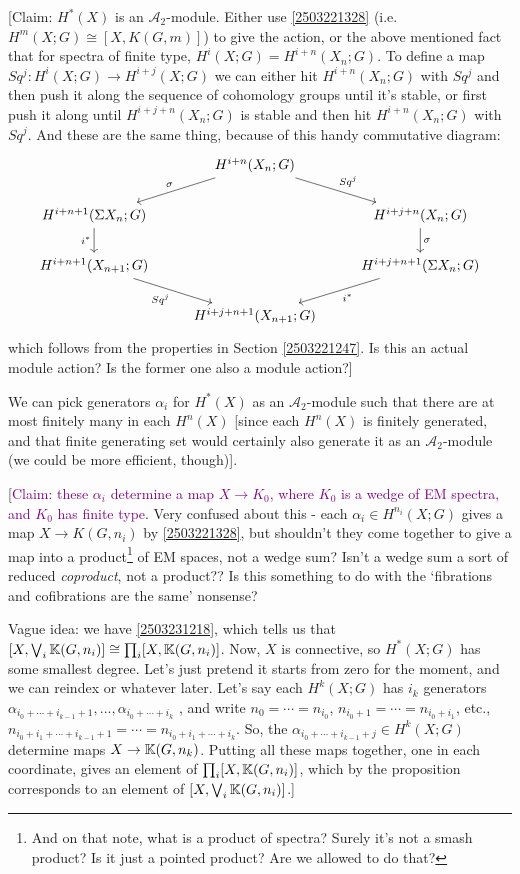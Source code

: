 \documentclass{MetricNotes2023}
\def\bb{\ensuremath\mathbb}
\def\A{\ensuremath{\mathscr{A}_2}}
\def\textcolour{\textcolor}
\begin{document}
[Claim: \(H^*(X)\) is an \(\mathscr{A}_2\)-module. Either use \ref{2503221328} (i.e. \(H^m(X;G)\cong[X,K(G,m)]\)) to give the action, or the above mentioned fact that for spectra of finite type, \(H^i(X; G)=H^{i+n}(X_n;G)\). To define a map \(Sq^j : H^{i}(X;G)\to H^{i+j}(X;G)\) we can either hit \(H^{i+n}(X_n;G)\) with \(Sq^j\) and then push it along the sequence of cohomology groups until it's stable, or first push it along until \(H^{i+j+n}(X_n;G)\) is stable and then hit \(H^{i+n}(X_n;G)\) with \(Sq^j\). And these are the same thing, because of this handy commutative diagram:
\[\begin{tikzcd} 
 & H^{i+n}(X_n;G)  \arrow[dl, "\sigma"'] \arrow[dr, "Sq^j"] & \\ 
 H^{i+n+1}(\Sigma X_n;G) \arrow[d, "i^*"'] & & H^{i+j+n}(X_n;G) \arrow[d, "\sigma"] \\ 
 H^{i+n+1}(X_{n+1};G) \arrow[dr, "Sq^j"'] & & H^{i+j+n+1}(\Sigma X_n;G) \arrow[dl, "i^*"] \\ 
 & H^{i+j+n+1}(X_{n+1};G) &  
\end{tikzcd}\] 
which follows from the properties in Section  \ref{2503221247}. Is this an actual module action? Is the former one also a module action?]

We can pick generators \(\alpha_i\) for \(H^*(X)\) as an \(\mathscr{A}_2\)-module such that there are at most finitely many in each \(H^n(X)\) [since each \(H^n(X)\) is finitely generated, and that finite generating set would certainly also generate it as an \(\A\)-module (we could be more efficient, though)].

[\textcolour{purple}{Claim: these \(\alpha_i\) determine a map \(X \to K_0\), where \(K_0\) is a wedge of EM spectra, and \(K_0\) has finite type}. Very confused about this - each \(\alpha_i\in H^{n_i}(X;G)\) gives a map \(X \to K(G,n_i)\) by \ref{2503221328}, but shouldn't they  come together to give a map into a product\footnote{And on that note, what is a product of spectra? Surely it's not a smash product? Is it just a pointed product? Are we allowed to do that?} of EM spaces, not a wedge sum? Isn't a wedge sum a sort of reduced \textit{coproduct}, not a product?? Is this something to do with the `fibrations and cofibrations are the same' nonsense?

Vague idea: we have \ref{2503231218}, which tells us that \([X, \bigvee_i \bb{K}(G,n_i)]\cong \prod_i[X, \bb{K}(G,n_i)]\). Now, \(X\) is connective, so \(H^*(X;G)\) has some smallest degree. Let's just pretend it starts from zero for the moment, and we can reindex or whatever later. Let's say each \(H^k(X;G)\) has \(i_k\) generators \(\alpha_{i_0+\cdots+i_{k-1}+1}, ...,\alpha_{i_0+\cdots+i_k}\)  , and write \(n_0=\cdots=n_{i_0}\), \(n_{i_0+1}=\cdots= n_{i_0+i_1}\), etc., \(n_{i_0+i_1+\cdots+i_{k-1}+1}=\cdots = n_{i_0+i_1+\cdots+i_k}\). So, the \(\alpha_{i_0+\cdots+i_{k-1}+j}\in H^k(X;G)\) determine maps \(X\to \bb{K}(G,n_k)\). Putting all these maps together, one in each coordinate, gives an element of \(\prod_i[X, \bb{K}(G,n_i)]\), which by the proposition corresponds to an element of \([X, \bigvee_i \bb{K}(G,n_i)]\).] 
\end{document}
